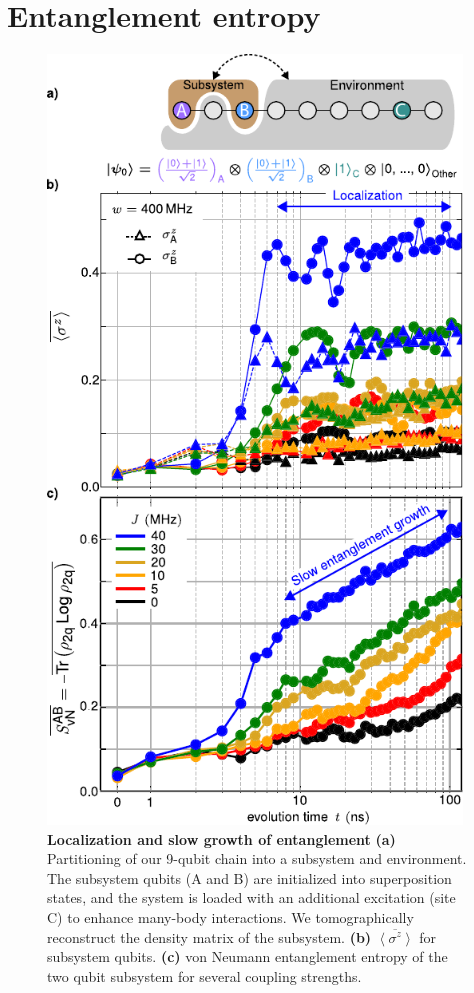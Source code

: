 \section{Entanglement entropy}
\begin{figure}[t]
 \centering
 \includegraphics[width=110mm]{./PDF/fig_4.pdf}
 \caption{
 \textbf{Localization and slow growth of entanglement}
 \textbf{(a)} Partitioning of our 9-qubit chain into a subsystem and environment.
 The subsystem qubits (A and B) are initialized into superposition states, and the system is loaded with an additional excitation (site C) to enhance many-body interactions. We tomographically reconstruct the  density matrix of the subsystem. \textbf{(b)} $\overline{\left< \sigma^z \right>}$ for subsystem qubits. \textbf{(c)} von Neumann entanglement entropy of the two qubit subsystem for several coupling strengths.}
\end{figure}
